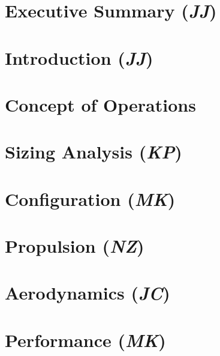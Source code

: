 \documentclass[conf]{new-aiaa}
\begin{document}
\newpage
\doublespacing


\section{Executive Summary (\textit{JJ})}
\label{section: Exec Summary}


\clearpage
\setcounter{section}{0}
\renewcommand{\thesection}{\Roman{section}}

\section{Introduction (\textit{JJ})}
\label{section: Intro}


\section{Concept of Operations}
\label{section: Conops}


\clearpage
\section{Sizing Analysis (\textit{KP})}
\label{section: Sizing Analysis}


\section{Configuration (\textit{MK})}
\label{section: Configuration}


\clearpage
\section{Propulsion (\textit{NZ})}
\label{section: Propulsion}


\clearpage
\section{Aerodynamics (\textit{JC})}
\label{section: Aerodynamics}


\clearpage
\section{Performance (\textit{MK})}
\label{section: Performance}

\end{document}
